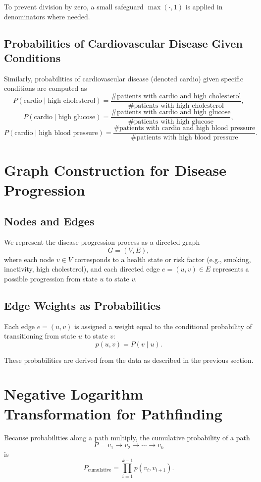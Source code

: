 \documentclass[11pt]{article}
\begin{document}
To prevent division by zero, a small safeguard \(\max(\cdot, 1)\) is applied in denominators where needed.

\subsection{Probabilities of Cardiovascular Disease Given Conditions}
Similarly, probabilities of cardiovascular disease (denoted \( \text{cardio} \)) given specific conditions are computed as
\[
P(\text{cardio} \mid \text{high cholesterol}) = \frac{\# \text{patients with cardio and high cholesterol}}{\# \text{patients with high cholesterol}},
\]
\[
P(\text{cardio} \mid \text{high glucose}) = \frac{\# \text{patients with cardio and high glucose}}{\# \text{patients with high glucose}},
\]
\[
P(\text{cardio} \mid \text{high blood pressure}) = \frac{\# \text{patients with cardio and high blood pressure}}{\# \text{patients with high blood pressure}}.
\]

\section{Graph Construction for Disease Progression}

\subsection{Nodes and Edges}
We represent the disease progression process as a directed graph
\[
G = (V, E),
\]
where each node \(v \in V\) corresponds to a health state or risk factor (e.g., smoking, inactivity, high cholesterol), and each directed edge \(e = (u,v) \in E\) represents a possible progression from state \(u\) to state \(v\).

\subsection{Edge Weights as Probabilities}
Each edge \(e = (u,v)\) is assigned a weight equal to the conditional probability of transitioning from state \(u\) to state \(v\):
\[
p(u,v) = P(v \mid u).
\]

These probabilities are derived from the data as described in the previous section.

\section{Negative Logarithm Transformation for Pathfinding}

Because probabilities along a path multiply, the cumulative probability of a path
\[
P = v_1 \to v_2 \to \cdots \to v_k
\]
is
\[
P_{\text{cumulative}} = \prod_{i=1}^{k-1} p(v_i, v_{i+1}).
\]
\end{document}
